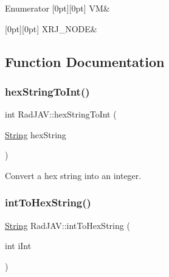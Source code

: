 \begin{DoxyEnumFields}{Enumerator}
[0pt][0pt]{}\mbox{\label{namespace_rad_j_a_v_a74e0b9a4c586a0346af4029e5a7e3d30a8c496b9e4e3cc4176831be1b38f25da3}} 
VM&\\
\hline

[0pt][0pt]{}\mbox{\label{namespace_rad_j_a_v_a74e0b9a4c586a0346af4029e5a7e3d30a188e6c69ae697d159a590bac0abe3c1f}} 
X\+R\+J\+\_\+\+N\+O\+DE&\\
\hline

\end{DoxyEnumFields}


\subsection{Function Documentation}
\mbox{\label{namespace_rad_j_a_v_a55e36aeb12f245adf1ce6d66c606aff3}} 
\subsubsection{\texorpdfstring{hex\+String\+To\+Int()}{hexStringToInt()}}
{\footnotesize\ttfamily int Rad\+J\+A\+V\+::hex\+String\+To\+Int (\begin{DoxyParamCaption}\item[{\mbox{\hyperlink{class_rad_j_a_v_1_1_string}{String}}}]{hex\+String }\end{DoxyParamCaption})}



Convert a hex string into an integer. 

\mbox{\label{namespace_rad_j_a_v_a5d863b29fa911427399686369688928a}} 
\subsubsection{\texorpdfstring{int\+To\+Hex\+String()}{intToHexString()}}
{\footnotesize\ttfamily \mbox{\hyperlink{class_rad_j_a_v_1_1_string}{String}} Rad\+J\+A\+V\+::int\+To\+Hex\+String (\begin{DoxyParamCaption}\item[{int}]{i\+Int }\end{DoxyParamCaption})}



